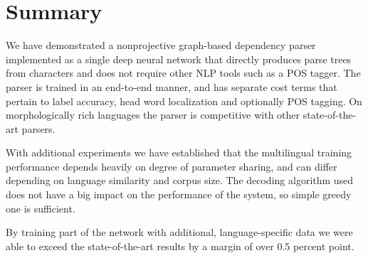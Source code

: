 \chapter{Summary}
We have demonstrated a nonprojective graph-based dependency parser implemented as a single deep
neural network that directly produces parse trees from characters and does not require
other NLP tools such as a POS tagger. The parser is trained in an end-to-end manner,
and has separate cost terms that pertain to label accuracy,
head word localization and optionally POS tagging. On
morphologically rich languages the parser is competitive
with other state-of-the-art parsers.

With additional experiments we have established that the multilingual training
performance depends heavily on degree of parameter sharing, and can differ
depending on language similarity and corpus size. The decoding
algorithm used does not have a big impact on the performance of the system,
so simple greedy one is sufficient.

By training part of the network with additional, language-specific data we were
able to exceed the state-of-the-art results by a margin of over 0.5 percent point.
